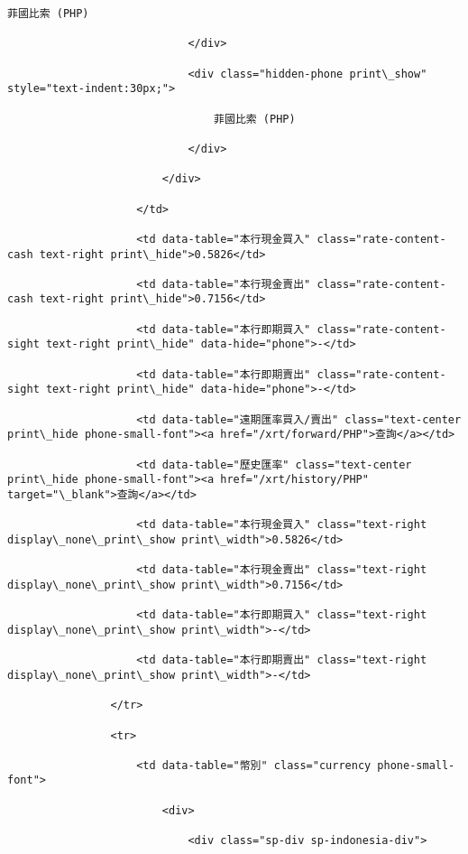 \documentclass[11pt]{article}
\begin{document}
\begin{Verbatim}[commandchars=\\\{\}]
                                菲國比索 (PHP)

                            </div>

                            <div class="hidden-phone print\_show" style="text-indent:30px;">

                                菲國比索 (PHP)

                            </div>

                        </div>

                    </td>

                    <td data-table="本行現金買入" class="rate-content-cash text-right print\_hide">0.5826</td>

                    <td data-table="本行現金賣出" class="rate-content-cash text-right print\_hide">0.7156</td>

                    <td data-table="本行即期買入" class="rate-content-sight text-right print\_hide" data-hide="phone">-</td>

                    <td data-table="本行即期賣出" class="rate-content-sight text-right print\_hide" data-hide="phone">-</td>

                    <td data-table="遠期匯率買入/賣出" class="text-center print\_hide phone-small-font"><a href="/xrt/forward/PHP">查詢</a></td>

                    <td data-table="歷史匯率" class="text-center print\_hide phone-small-font"><a href="/xrt/history/PHP" target="\_blank">查詢</a></td>

                    <td data-table="本行現金買入" class="text-right display\_none\_print\_show print\_width">0.5826</td>

                    <td data-table="本行現金賣出" class="text-right display\_none\_print\_show print\_width">0.7156</td>

                    <td data-table="本行即期買入" class="text-right display\_none\_print\_show print\_width">-</td>

                    <td data-table="本行即期賣出" class="text-right display\_none\_print\_show print\_width">-</td>

                </tr>

                <tr>

                    <td data-table="幣別" class="currency phone-small-font">

                        <div>

                            <div class="sp-div sp-indonesia-div">


\end{Verbatim}
\end{document}
